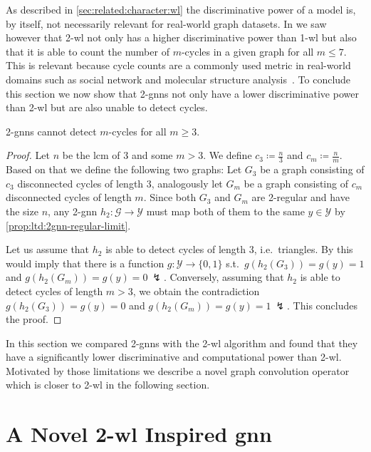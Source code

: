 As described in \cref{sec:related:character:wl} the discriminative power of a model is, by itself, not necessarily relevant for real-world graph datasets.
In  we saw however that 2-\acs{wl} not only has a higher discriminative power than 1-\acs{wl} but also that it is able to count the number of $m$-cycles in a given graph for all $m \leq 7$.
This is relevant because cycle counts are a commonly used metric in real-world domains such as social network and molecular structure analysis~\cite{Milo2002}\cite{Newman2003}\cite{Welser2007}\cite{Adamson1973}\cite{Kekule1866}.
To conclude this section we now show that 2-\acsp{gnn} not only have a lower discriminative power than 2-\acs{wl} but are also unable to detect cycles.
\begin{prop}\label{prop:ltd:2gnn-cycle-limit}
	2-\acsp{gnn} cannot detect $m$-cycles for all $m \geq 3$.
\end{prop}
\begin{proof}
	Let $n$ be the \ac{lcm} of $3$ and some $m > 3$.
	We define $c_3 \coloneqq \frac{n}{3}$ and $c_m \coloneqq \frac{n}{m}$.
	Based on that we define the following two graphs:
	Let $G_3$ be a graph consisting of $c_3$ disconnected cycles of length $3$, analogously let $G_m$ be a graph consisting of $c_m$ disconnected cycles of length $m$.
	Since both $G_3$ and $G_m$ are 2-regular and have the size $n$, any 2-\ac{gnn} $h_2: \mathcal{G} \to \mathcal{Y}$ must map both of them to the same $y \in \mathcal{Y}$ by \cref{prop:ltd:2gnn-regular-limit}.

	Let us assume that $h_2$ is able to detect cycles of length $3$, i.e.\ triangles.
	By  this would imply that there is a function $g: \mathcal{Y} \to \{ 0, 1\}$ s.t.\ $g(h_2(G_3)) = g(y) = 1$ and $g(h_2(G_m)) = g(y) = 0\ \lightning$.
	Conversely, assuming that $h_2$ is able to detect cycles of length $m > 3$, we obtain the contradiction $g(h_2(G_3)) = g(y) = 0$  and $g(h_2(G_m)) = g(y) = 1\ \lightning$.
	This concludes the proof.
\end{proof}

In this section we compared 2-\acsp{gnn} with the 2-\acs{wl} algorithm and found that they have a significantly lower discriminative and computational power than 2-\acs{wl}.
Motivated by those limitations we describe a novel graph convolution operator which is closer to 2-\acs{wl} in the following section.

\section{A Novel 2-\acs*{wl} Inspired \acs*{gnn}}%
\label{sec:ltd:wl2gnn}

